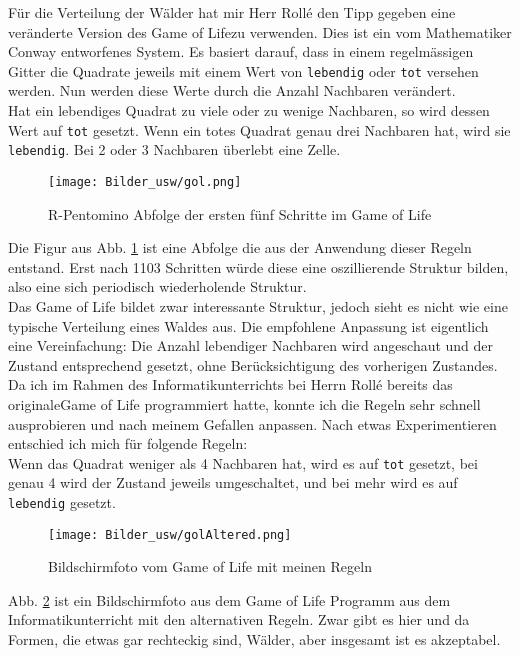 \documentclass[12pt,twoside]{book}
\begin{document}
F\"ur die Verteilung der W\"alder hat mir Herr Rollé den Tipp gegeben eine ver\"anderte Version des \glqq Game of Life\grqq{ }zu verwenden.
Dies ist ein vom Mathematiker Conway entworfenes System. 
Es basiert darauf, dass in einem regelm\"assigen Gitter die Quadrate jeweils mit einem Wert von \texttt{lebendig} oder \texttt{tot} versehen werden.
Nun werden diese Werte durch die Anzahl Nachbaren ver\"andert. \\
Hat ein lebendiges Quadrat zu viele oder zu wenige Nachbaren, so wird dessen Wert auf \texttt{tot} gesetzt. Wenn ein totes Quadrat genau drei Nachbaren hat, wird sie \texttt{lebendig}.
Bei 2 oder 3 Nachbaren \"uberlebt eine Zelle.
\begin{figure}[H]
\texttt{[image: Bilder\_usw/gol.png]}
 \centering
 \caption{R-Pentomino Abfolge der ersten f\"unf Schritte im Game of Life}
 \centering
  \label{fig:gol}
\end{figure}
Die Figur aus Abb. \ref{fig:gol} ist eine Abfolge die aus der Anwendung dieser Regeln entstand. Erst nach 1103 Schritten w\"urde diese eine oszillierende Struktur bilden, also eine sich periodisch wiederholende Struktur.\\
Das Game of Life bildet zwar interessante Struktur, jedoch sieht es nicht wie eine typische Verteilung eines Waldes aus.
Die empfohlene Anpassung ist eigentlich eine Vereinfachung: Die Anzahl lebendiger Nachbaren wird angeschaut und der Zustand entsprechend gesetzt, ohne Ber\"ucksichtigung des vorherigen Zustandes.
Da ich im Rahmen des Informatikunterrichts bei Herrn Rollé bereits das  \glqq originale\grqq{ }Game of Life programmiert hatte, konnte ich die Regeln sehr schnell ausprobieren und nach meinem Gefallen anpassen.
Nach etwas Experimentieren entschied ich mich f\"ur folgende Regeln:\\
Wenn das Quadrat weniger als 4 Nachbaren hat, wird es auf \texttt{tot} gesetzt, bei genau 4 wird der Zustand jeweils umgeschaltet, und bei mehr wird es auf \texttt{lebendig} gesetzt.

\begin{figure}[H]
\centering
\texttt{[image: Bilder\_usw/golAltered.png]}
 \caption{Bildschirmfoto vom Game of Life mit meinen Regeln}
  \label{fig:golAlt}
\centering
\end{figure}

Abb. \ref{fig:golAlt} ist ein Bildschirmfoto aus dem Game of Life Programm aus dem Informatikunterricht mit den alternativen Regeln. Zwar gibt es hier und da Formen, die etwas gar rechteckig
 sind, W\"alder, aber insgesamt ist es akzeptabel.
\end{document}
